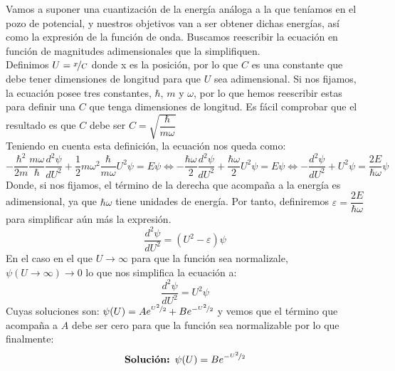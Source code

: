 \documentclass{report}
\begin{document}
    \noindent Vamos a suponer una cuantización de la energía análoga a la
    que teníamos en el pozo de potencial, y nuestros objetivos van a ser
    obtener dichas energías, así como la expresión de la función de onda.
    Buscamos reescribir la ecuación en función de magnitudes adimensionales
    que la simplifiquen.\\

    \noindent Definimos $U=\nicefrac{x}{C}$ donde x es la posición, por lo que
    $C$ es una constante que debe tener dimensiones de longitud para que
    $U$ sea adimensional. Si nos fijamos, la ecuación posee tres constantes,
    $\hbar$, $m$ y $\omega$, por lo que hemos reescribir estas para definir
    una $C$ que tenga dimensiones de longitud. Es fácil comprobar que el 
    resultado es que $C$ debe ser $\boxed{C=\sqrt{\dfrac{\hbar}{m\omega}}}$\\

    \noindent Teniendo en cuenta esta definición, la ecuación nos queda como:
    \[-\dfrac{\hbar^2}{2m}\dfrac{m\omega}{\hbar}\dfrac{d^2\psi}{dU^2}+\dfrac12
    m\omega^2\dfrac{\hbar}{m\omega}U^2\psi=E\psi\Longleftrightarrow
    -\dfrac{\hbar\omega}{2}\dfrac{d^2\psi}{dU^2}+\dfrac{\hbar\omega}{2}U^2\psi=E\psi
    \Longleftrightarrow -\dfrac{d^2\psi}{dU^2}+U^2\psi=\dfrac{2E}{\hbar\omega}\psi\]
    Donde, si nos fijamos, el término de la derecha que acompaña a la energía
    es adimensional, ya que $\hbar\omega$ tiene unidades de energía. Por tanto,
    definiremos $\varepsilon=\dfrac{2E}{\hbar\omega}$ para simplificar aún más la
    expresión.
    \begin{equation}
      \boxed{\dfrac{d^2\psi}{dU^2}=(U^2-\varepsilon)\psi}
      \label{eq:potencialArmónicoU}
    \end{equation}
    \noindent En el caso en el que $U\longrightarrow\infty$ para que la función sea
    normalizale, $\psi(U\rightarrow\infty)\longrightarrow 0$ lo que nos simplifica
    la ecuación a:
    \[\dfrac{d^2\psi}{dU^2}=U^2\psi\]
    Cuyas soluciones son: $\psi(U)=Ae^{\nicefrac{U^2}{2}}+Be^{-\nicefrac{U^2}{2}}$ y
    vemos que el término que acompaña a $A$ debe ser cero para que la función 
    sea normalizable por lo que finalmente:
    \[\text{\textbf{Solución: }}\psi(U)=Be^{-\nicefrac{U^2}{2}}\]\\
\end{document}
